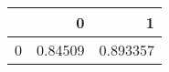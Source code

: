 \begin{tabular}{lrr}
\toprule
{} &        0 &         1 \\
\midrule
0 &  0.84509 &  0.893357 \\
\bottomrule
\end{tabular}
